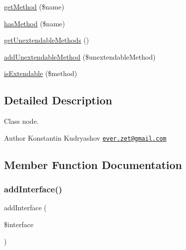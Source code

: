 \begin{DoxyCompactItemize}
\item 
\mbox{\hyperlink{class_prophecy_1_1_doubler_1_1_generator_1_1_node_1_1_class_node_a020b4f470a4c7b67a7d530b40dddf961}{get\+Method}} (\$name)
\item 
\mbox{\hyperlink{class_prophecy_1_1_doubler_1_1_generator_1_1_node_1_1_class_node_a6d24132dc92242f7f71aa98e7ae86442}{has\+Method}} (\$name)
\item 
\mbox{\hyperlink{class_prophecy_1_1_doubler_1_1_generator_1_1_node_1_1_class_node_aa9eeb3801ccbac8fe075db29e6e57dcd}{get\+Unextendable\+Methods}} ()
\item 
\mbox{\hyperlink{class_prophecy_1_1_doubler_1_1_generator_1_1_node_1_1_class_node_a275dbeed79a5e419b6bb16127402066a}{add\+Unextendable\+Method}} (\$unextendable\+Method)
\item 
\mbox{\hyperlink{class_prophecy_1_1_doubler_1_1_generator_1_1_node_1_1_class_node_a12b8ffe13dc666dd9341cde1e4187bfc}{is\+Extendable}} (\$method)
\end{DoxyCompactItemize}


\subsection{Detailed Description}
Class node.

\begin{DoxyAuthor}{Author}
Konstantin Kudryashov \href{mailto:ever.zet@gmail.com}{\tt ever.\+zet@gmail.\+com} 
\end{DoxyAuthor}


\subsection{Member Function Documentation}
\mbox{\label{class_prophecy_1_1_doubler_1_1_generator_1_1_node_1_1_class_node_a8ee340e93f5c12065057df00a3b37e3a}} 
\subsubsection{\texorpdfstring{add\+Interface()}{addInterface()}}
{\footnotesize\ttfamily add\+Interface (\begin{DoxyParamCaption}\item[{}]{\$interface }\end{DoxyParamCaption})}


